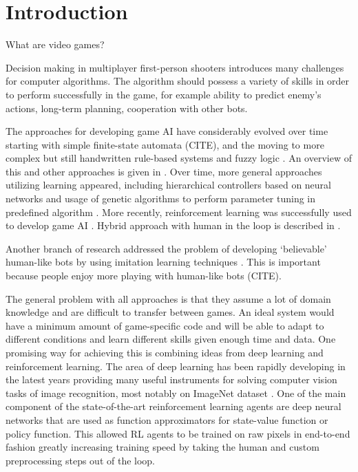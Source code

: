 \section{Introduction}

What are video games?


Decision making in multiplayer first-person shooters introduces many challenges for computer algorithms.
The algorithm should possess a variety of skills in order to perform successfully in the game, 
for example ability to predict enemy's actions, long-term planning, cooperation with other bots.


The approaches for developing game AI have considerably evolved over time starting with simple finite-state automata (CITE), and the moving to more complex but still handwritten rule-based systems \cite{RuleBased} and fuzzy logic \cite{FuzzyLogic}. An overview of this and other approaches is given in \cite{AITechniques}.
Over time, more general approaches utilizing learning appeared,
including hierarchical controllers based on neural networks \cite{HierarchicalController} and usage of genetic algorithms to perform parameter tuning in predefined algorithm \cite{GeneticTuning}.
More recently, reinforcement learning was successfully used to develop game AI \cite{RLGallagher}.
Hybrid approach with human in the loop is described in \cite{InteractiveGallagher}.

Another branch of research addressed the problem of developing `believable' human-like bots \cite{BelievableBots} by using imitation learning techniques \cite{UT2}. This is important because people enjoy more playing with human-like bots (CITE).


The general problem with all approaches is that they assume a lot of domain knowledge and are difficult to transfer between games. An ideal system would have a minimum amount of game-specific code and will be able to adapt to different conditions and learn different skills given enough time and data.
One promising way for achieving this is combining ideas from deep learning and reinforcement learning.
The area of deep learning has been rapidly developing in the latest years providing many useful
instruments for solving computer vision tasks of image recognition, most notably on ImageNet dataset \cite{AlexNet}. 
One of the main component of the state-of-the-art reinforcement learning agents are deep neural networks that are used as function approximators for state-value function or policy function.
This allowed RL agents to be trained on raw pixels in end-to-end fashion greatly increasing training speed by taking the human and custom preprocessing steps out of the loop.

